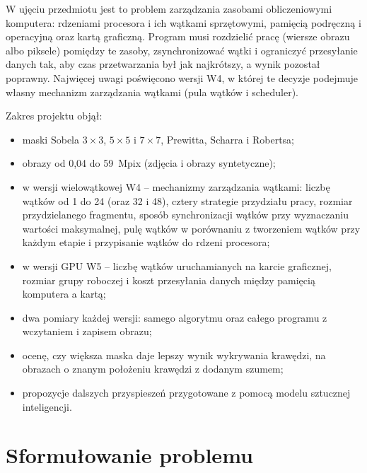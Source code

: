 \documentclass[12pt,a4paper]{article}
\begin{document}
W ujęciu przedmiotu jest to problem zarządzania zasobami obliczeniowymi komputera: rdzeniami procesora i ich wątkami sprzętowymi, pamięcią podręczną i operacyjną oraz kartą graficzną. Program musi rozdzielić pracę (wiersze obrazu albo piksele) pomiędzy te zasoby, zsynchronizować wątki i ograniczyć przesyłanie danych tak, aby czas przetwarzania był jak najkrótszy, a wynik pozostał poprawny. Najwięcej uwagi poświęcono wersji W4, w której te decyzje podejmuje własny mechanizm zarządzania wątkami (pula wątków i scheduler).

Zakres projektu objął:
\begin{itemize}
	\item maski Sobela $3\times3$, $5\times5$ i $7\times7$, Prewitta, Scharra i Robertsa;
	\item obrazy od 0,04 do 59~Mpix (zdjęcia i obrazy syntetyczne);
	\item w wersji wielowątkowej W4 -- mechanizmy zarządzania wątkami: liczbę wątków od 1 do 24 (oraz 32 i 48), cztery strategie przydziału pracy, rozmiar przydzielanego fragmentu, sposób synchronizacji wątków przy wyznaczaniu wartości maksymalnej, pulę wątków w porównaniu z tworzeniem wątków przy każdym etapie i przypisanie wątków do rdzeni procesora;
	\item w wersji GPU W5 -- liczbę wątków uruchamianych na karcie graficznej, rozmiar grupy roboczej i koszt przesyłania danych między pamięcią komputera a kartą;
	\item dwa pomiary każdej wersji: samego algorytmu oraz całego programu z wczytaniem i zapisem obrazu;
	\item ocenę, czy większa maska daje lepszy wynik wykrywania krawędzi, na obrazach o znanym położeniu krawędzi z dodanym szumem;
	\item propozycje dalszych przyspieszeń przygotowane z pomocą modelu sztucznej inteligencji.
\end{itemize}

\section{Sformułowanie problemu}
\end{document}
